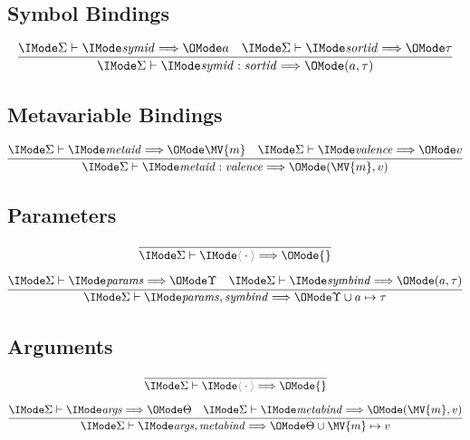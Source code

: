 \subsection*{Symbol Bindings\hfill {}}

\begin{gather}
  \infer{
    \Elab{\Sigma}{\ProdBind{\SortSymId}{\SortSortId}}{(a, \tau)}
  }{
    \Elab{\Sigma}{\SortSymId}{a} &
    \Elab{\Sigma}{\SortSortId}{\tau}
  }
\end{gather}

\subsection*{Metavariable Bindings\hfill {}}

\begin{gather}
  \infer{
    \Elab{\Sigma}{\ProdBind{\SortMetaId}{\SortValence}}{(\MV{m}, v)}
  }{
    \Elab{\Sigma}{\SortMetaId}{\MV{m}} &
    \Elab{\Sigma}{\SortValence}{v}
  }
\end{gather}

\subsection*{Parameters\hfill \framebox{$\Elab{\Sigma}{\SortParams}{\Upsilon}$}}

\begin{gather}
  \infer{
    \Elab{\Sigma}{\ProdEmptyCtx}{\{\}}
  }{
  }\\[6pt]
  \infer{
    \Elab{\Sigma}{\ProdExtendCtx{\SortParams}{\SortSymBind}}{
      \Upsilon\cup{a \mapsto\tau}
    }
  }{
    \Elab{\Sigma}{\SortParams}{\Upsilon} &
    \Elab{\Sigma}{\SortSymBind}{(a, \tau)}
  }
\end{gather}

\subsection*{Arguments\hfill \framebox{$\Elab{\Sigma}{\SortArgs}{\Theta}$}}

\begin{gather}
  \infer{
    \Elab{\Sigma}{\ProdEmptyCtx}{\{\}}
  }{
  }\\[6pt]
  \infer{
    \Elab{\Sigma}{\ProdExtendCtx{\SortArgs}{\SortMetaBind}}{
      \Theta\cup{\MV{m} \mapsto v}
    }
  }{
    \Elab{\Sigma}{\SortArgs}{\Theta} &
    \Elab{\Sigma}{\SortMetaBind}{(\MV{m}, v)}
  }
\end{gather}


